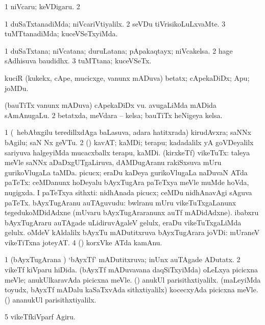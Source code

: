 {{{{{{\noindent
\gl{\pagu}
\bmng
\bnum
\num{1}  niVcaru; keVDigaru. 
\num{2}  
\enum
\emng
\eentry

\bentry
{}
  \gl{\kirxvi}\bmng
\bnum
\num{1} duSaTxtanadiMda; niVcariVtiyalilx. 
\num{2} seVDu tiVrisikoLuLxvaMte. 
\num{3} tuMTtanadiMda; kuceVSeTxyiMda. 
\enum
\emng
\eentry

\bentry
{}
  \gl{\nA}\bmng
\bnum
\num{1} duSaTxtana; niVcatana; duruLatana; pApakaqtayx; niVcakelsa. 
\num{2} hage sAdhisuva baudidhx. 
\num{3} tuMTtana; kuceVSeTx. 
\enum
\emng
\eentry

\bentry
{}
  \gl{\nA}\bmng
kuciR (kukekx, cApe, mucicxge, \mo vanunx mADuva) betatx; cApekaDiDx; Apu; joMDu. 
\emng
\eentry

\bentry
{}
  \gl{\nA}\bmng
\bnum
{} 
\banum
{} (bauTiTx \mo vanunx mADuva) cApekaDiDx \mo vu. 
 avugaLiMda mADida sAmAnugaLu. 
\eanum
\numie
\num{2} betatxda, meVdara -- kelsa; bauTiTx heNigeya kelsa. 
\enum
\emng
\eentry

\bentry
{} 
\gl{\nA}
\expl{}
\bmng
\bnum
\num{1} (\kanmu\ hebAbxgilu teredillxdAga baLasuva, adara hatitxrada) kirudAvxra; saNNx bAgilu; saN Nx geVTu. 
\num{2} (\ame) kavAT; kaMDi; terapu; kadadalilx yA goVDeyalilx sariyuva halgeyiMda mucacxballx terapu, kaMDi. 
 (kirxkeTf) vikeTuTx: 
\banum
{} taleya meVle saNNx aDaDxgUTgaLiruva, dAMDugAranu rakiSxsuva mUru gurikoVlugaLa taMDa. 
 picucx; eraDu kaDeya gurikoVlugaLa naDuvaN ATda paTeTx:  ceMDanunx hoDeyalu bAyxTugAra paTeTxya meVle muMde hoVda, nugigxda. 
 I paTeTxya sithxti:  nidhAnada picucx; ceMDu nidhAnavAgi sAguva paTeTx. 
 bAyxTugAranu auTAguvudu:  bwlranu mUru vikeTuTxgaLanunx tegedukoMDidAdxne (mUvaru bAyxTugAraranunx auTf mADidAdxne).  ibabxru bAyxTugAraru auTAgade uLidiruvAgaleV gelulx, eraDu vikeTuTxgaLiMda gelulx. 
 oMdeV kAldalilx bAyxTu mADutitxruva bAyxTugArara joVDi:  mUraneV vikeTiTxna joteyAT. 
\eanum
\numie
\num{4} (\ame) korxVke  ATda kamAnu. 
\enum
\emng

\noindent
\gl{\pagu}
\bmng
\bnum
\num{1}  (bAyxTugArana \vi) `bAyxTf' mADutitxruva; inUnx auTAgade ADutatx. 
\num{2}  vikeTf kiVparu hiDida. 
  
\banum
{} (bAyxTf mADuvavana daqSiTxyiMda) oLeLxya picicxna meVle; anukUlkaravAda picicxna meVle. 
 (\AmA) anukUl parisithxtiyalilx. 
\eanum
\numie
{}  
\banum
{} (maLeyiMda toyudx, bAyxTf mADalu kaSaTxvAda sithxtiyalilx) kocecxyAda picicxna meVle. 
 (\AmA) ananukUl parisithxtiyalilx. 
\eanum
\numie
\num{5}  vikeTfkiVparf Agiru. 
\enum
\emng
\eentry

}}}}}}
